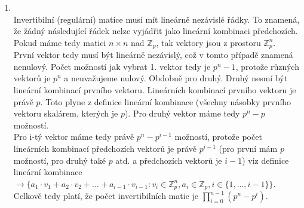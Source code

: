 \documentclass[12pt]{article}
\begin{document}
	\begin{enumerate}
		\item \quad\\
		Invertibilní (regulární) matice musí mít lineárně nezávislé řádky. To znamená, že žádný následující řádek nelze vyjádřit jako lineární kombinaci předchozích. Pokud máme tedy matici $n \times n$ nad $\mathbb{Z}_{p}$, tak vektory jsou z prostoru $\mathbb{Z}^{n}_{p}$.\\
		První vektor tedy musí být lineárně nezávislý, což v tomto případě znamená nenulový. Počet možností jak vybrat 1. vektor tedy je $p^n - 1$, protože různých vektorů je $p^n$ a neuvažujeme nulový. Obdobně pro druhý. Druhý nesmí být lineární kombinací prvního vektoru. Lineárních kombinací prvního vektoru je právě $p$. Toto plyne z definice lineární kombinace (všechny násobky prvního vektoru skalárem, kterých je $p$). Pro druhý vektor máme tedy $p^n - p$ možností.\\
		Pro i-tý vektor máme tedy právě $p^n - p^{i-1}$ možností, protože počet lineárních kombinací předchozích vektorů je právě $p^{i-1}$ (pro první mám $p$ možností, pro druhý také $p$ atd. a předchozích vektorů je $i-1$) viz definice lineární kombinace $\rightarrow \{a_1 \cdot v_1 + a_2 \cdot v_2 + \dots + a_{i-1} \cdot v_{i-1} : v_i \in \mathbb{Z}_{p}^n, a_i \in \mathbb{Z}_{p}, i \in \{1, \dots, i-1\} \}$. Celkově tedy platí, že počet invertibilních matic je $\prod_{i=0}^{n-1} (p^n-p^i)$.
		

\end{enumerate}
\end{document}
